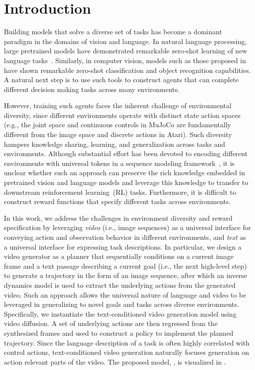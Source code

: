 \section{Introduction}\label{sec:introduction}

Building models that solve a diverse set of tasks has become a dominant paradigm in the domains of vision and language. In natural language processing, large pretrained models have demonstrated remarkable zero-shot learning of new language tasks~\citep{brown2020language,chowdhery2022palm,hoffmann2022training}. Similarly, in computer vision, models such as those proposed in~\citep{radford2021learning,alayrac2022flamingo}
have shown remarkable zero-shot classification and object recognition capabilities. A natural next step is to use such tools to construct agents that can complete different decision making tasks across many environments.

However, 
training such agents faces the inherent challenge of environmental diversity, since different environments operate with distinct state action spaces (e.g., the joint space and continuous controls in MuJoCo are fundamentally different from the image space and discrete actions in Atari). Such diversity hampers knowledge sharing, learning, and generalization across tasks and environments. Although substantial effort has been devoted to encoding different environments with universal tokens in a sequence modeling framework~\citep{reed2022generalist}, it is unclear whether such an approach can preserve the rich knowledge embedded in pretrained vision and language models and leverage this knowledge to transfer to downstream reinforcement learning~(RL) tasks. Furthermore, it is difficult to construct reward functions that specify different tasks across environments.

In this work, we address the challenges in environment diversity and reward specification by leveraging \emph{video} (i.e., image sequences) as a universal interface for conveying action and observation behavior in different environments, and \emph{text} as a universal interface for expressing task descriptions. In particular, we design a video generator as a planner that sequentially conditions on a current image frame and a text passage describing a current goal (i.e., the next high-level step) to generate a trajectory in the form of an image sequence, after which an inverse dynamics model is used to extract the underlying actions from the generated video. 
Such an approach allows the universal nature of language and video to be leveraged in generalizing to novel goals and tasks across diverse environments. Specifically, we instantiate the text-conditioned video generation model using video diffusion.
A set of underlying actions are then regressed from the synthesized frames and used to construct a policy to implement the planned trajectory. Since the language description of a task is often highly correlated with control actions, text-conditioned video generation naturally focuses generation on action relevant parts of the video. The proposed model, \textit{\model}, is visualized in . 


